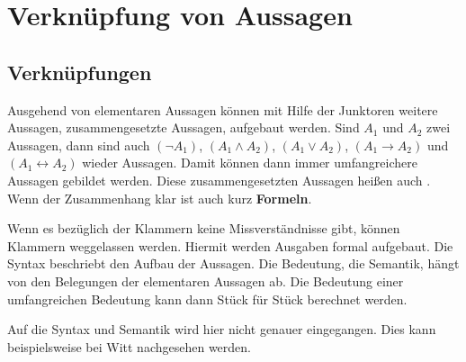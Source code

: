 \section{Verknüpfung von Aussagen}
\label{sec:ElemLogik-Verknuepfung}

\subsection*{Verknüpfungen}

\begin{Unit}[Anmerkung]
Ausgehend von elementaren Aussagen  können mit Hilfe der Junktoren weitere 
Aussagen, zusammengesetzte Aussagen, aufgebaut werden. Sind $A_1$ und $A_2$ 
zwei Aussagen, dann sind auch $(\neg A_1)$, $(A_1 \land A_2)$, 
$(A_1 \lor A_2)$, $(A_1 \rightarrow A_2)$ und $(A_1 \leftrightarrow A_2)$ 
wieder Aussagen. Damit können dann immer umfangreichere Aussagen gebildet 
werden. Diese zusammengesetzten Aussagen heißen auch 
. Wenn der Zusammenhang klar ist auch 
kurz \textbf{Formeln}.

Wenn es bezüglich der Klammern keine Missverständnisse gibt, können Klammern
weggelassen werden. Hiermit werden Ausgaben formal aufgebaut. Die Syntax 
beschriebt den Aufbau der Aussagen. Die Bedeutung, die Semantik, hängt von 
den Belegungen der elementaren Aussagen ab. Die Bedeutung einer 
umfangreichen Bedeutung kann dann Stück für Stück berechnet werden.

Auf die Syntax und Semantik wird hier nicht genauer eingegangen. Dies kann
beispielsweise bei Witt \cite{Witt.2001} nachgesehen werden. 
\end{Unit}

